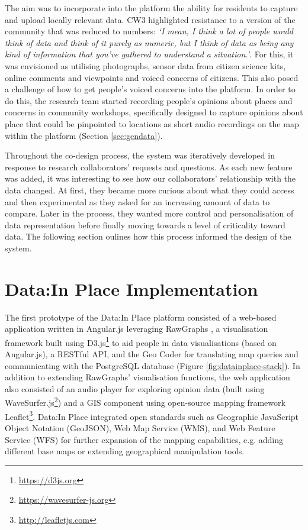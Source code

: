 The aim was to incorporate into the platform the ability for residents to capture and upload locally relevant data. CW3 highlighted resistance to a version of the community that was reduced to numbers: \textit{`I mean, I think a lot of people would think of data and think of it purely as numeric, but I think of data as being any kind of information that you've gathered to understand a situation.'}. For this, it was envisioned as utilising photographs, sensor data from citizen science kits, online comments and viewpoints and voiced concerns of citizens. This also posed a challenge of how to get people's voiced concerns into the platform. In order to do this, the research team started recording people's opinions about places and concerns in community workshops, specifically designed to capture opinions about place that could be pinpointed to locations as short audio recordings on the map within the platform (Section \ref{sec:gendata}).

Throughout the co-design process, the system was iteratively developed in response to research collaborators' requests and questions. As each new feature was added, it was interesting to see how our collaborators' relationship with the data changed. At first, they became more curious about what they could access and then experimental as they asked for an increasing amount of data to compare. Later in the process, they wanted more control and personalisation of data representation before finally moving towards a level of criticality toward data. The following section oulines how this process informed the design of the system.

\section{Data:In Place Implementation}
The first prototype of the Data:In Place platform consisted of a web-based application written in Angular.js leveraging RawGraphs \citep{mauri_rawgraphs:_2017}, a visualisation framework built using D3.js\footnote{\url{https://d3js.org}} to aid people in data visualisations (based on Angular.js), a RESTful API, and the Geo Coder for translating map queries and communicating with the PostgreSQL database (Figure \ref{fig:datainplace-stack}). In addition to extending RawGraphs' visualisation functions, the web application also consisted of an audio player for exploring opinion data (built using WaveSurfer.js\footnote{\url{https://wavesurfer-js.org}}) and a GIS component using open-source mapping framework Leaflet\footnote{\url{http://leafletjs.com}}. Data:In Place integrated open standards such as Geographic JavaScript Object Notation (GeoJSON), Web Map Service (WMS), and Web Feature Service (WFS) for further expansion of the mapping capabilities, e.g. adding different base maps or extending geographical manipulation tools.

